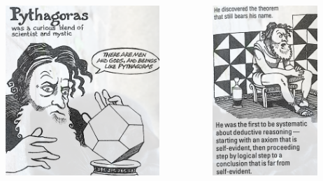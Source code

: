 \documentclass[unicode, 14pt, aspectratio=169]{beamer}
\begin{document}
\begin{frame}
\begin{columns}
\begin{column}{0.25\textwidth}
\begin{center}
    \end{center}
  \end{column}
  \begin{column}{0.25\textwidth}
    \begin{center}
      \includegraphics[width=0.8\textwidth]{images/pythagoras.png}
    \end{center}
  \end{column}
  \begin{column}{0.25\textwidth}
    \begin{center}
      \includegraphics[width=0.8\textwidth]{images/pythagoras2.png}

\end{center}
\end{column}
\end{columns}
\end{frame}
\end{document}
